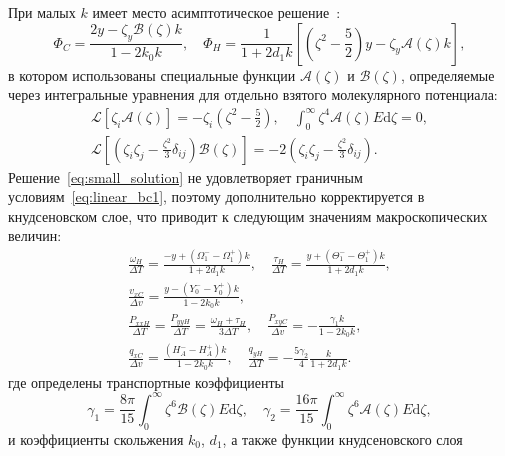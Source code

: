\documentclass[a4paper,12pt]{article}
\newcommand{\dd}{\mathrm{d}}
\begin{document}
При малых \(k\) имеет место асимптотическое решение~\cite{Sone2007}:
\begin{equation}\label{eq:small_solution}
    \Phi_C = \frac{2y - \zeta_y \mathcal{B}(\zeta) k}{1-2k_0k}, \quad
    \Phi_H = \frac1{1+2d_1k}\left[ \left(\zeta^2-\frac52\right)y
        - \zeta_y \mathcal{A}(\zeta)k \right],
\end{equation}
в котором использованы специальные функции \( \mathcal{A}(\zeta) \) и \( \mathcal{B}(\zeta) \),
определяемые через интегральные уравнения для отдельно взятого молекулярного потенциала:
\begin{gather}
    \mathcal{L}[\zeta_i \mathcal{A}(\zeta)] = -\zeta_i \left( \zeta^2 - \frac52 \right),
    \quad \int_0^\infty \zeta^4 \mathcal{A}(\zeta)E\dd\zeta = 0, \label{eq:def_A} \\
    \mathcal{L}\left[\left(\zeta_i\zeta_j-\frac{\zeta^2}3\delta_{ij}\right) \mathcal{B}(\zeta)\right]
        = -2 \left(\zeta_i\zeta_j-\frac{\zeta^2}3\delta_{ij}\right). \label{eq:def_B}
\end{gather}
Решение~\eqref{eq:small_solution} не удовлетворяет граничным условиям~\eqref{eq:linear_bc1},
поэтому дополнительно корректируется в кнудсеновском слое,
что приводит к следующим значениям макроскопических величин:
\begin{equation}\label{eq:small_macro}
    \begin{gathered}
    \frac{\omega_{H}}{\Delta{T}} = \frac{-y + (\Omega_1^--\Omega_1^+)k}{1+2d_1k}, \quad
    \frac{\tau_{H}}{\Delta{T}} = \frac{y + (\Theta_1^--\Theta_1^+)k}{1+2d_1k}, \\
    \frac{v_{xC}}{\Delta{v}} = \frac{y - (Y_0^--Y_0^+)k}{1-2k_0k}, \\
    \frac{P_{xxH}}{\Delta{T}} = \frac{P_{yyH}}{\Delta{T}} = \frac{\omega_{H}+\tau_{H}}{3\Delta{T}}, \quad
    \frac{P_{xyC}}{\Delta{v}} = - \frac{\gamma_1 k}{1-2k_0k}, \\
    \frac{q_{xC}}{\Delta{v}} = \frac{(H_A^--H_A^+)k}{1-2k_0k}, \quad
    \frac{q_{yH}}{\Delta{T}} = - \frac{5\gamma_2}4 \frac{k}{1+2d_1k}.
    \end{gathered}
\end{equation}
где определены транспортные коэффициенты
\begin{equation}\label{eq:transport_coeffs}
    \gamma_1 = \frac{8\pi}{15}\int_0^\infty \zeta^6 \mathcal{B}(\zeta)E\dd\zeta, \quad
    \gamma_2 = \frac{16\pi}{15}\int_0^\infty \zeta^6 \mathcal{A}(\zeta)E\dd\zeta,
\end{equation}
и коэффициенты скольжения \(k_0\), \(d_1\), а также функции кнудсеновского слоя
\end{document}
